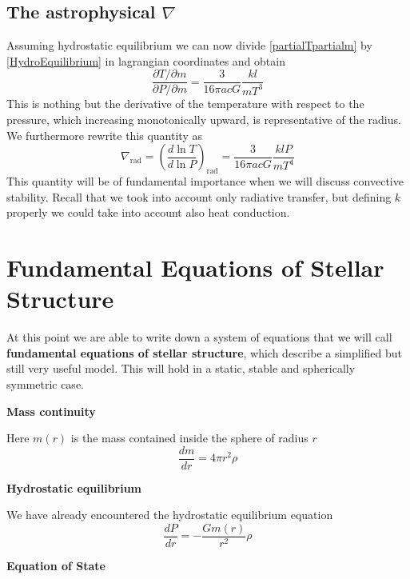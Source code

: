 \subsection{The astrophysical $\nabla$}
Assuming hydrostatic equilibrium we can now divide \ref{partialTpartialm} by \ref{HydroEquilibrium} in lagrangian coordinates and obtain
\begin{equation}
	\frac{\partial T/\partial m}{\partial P / \partial m} = \frac{3}{16 \pi a c G} \frac{k l}{m T^3}
\end{equation}
This is nothing but the derivative of the temperature with respect to the pressure, which increasing monotonically upward, is representative of the radius. We furthermore rewrite this quantity as
\begin{equation}\label{nablarad}
	\nabla_{\mathrm{rad}} = \left( \frac{d \ln T}{d \ln P}  \right)_{\mathrm{rad}}= \frac{3}{16 \pi a c G} \frac{k l P}{m T^4}
\end{equation}
This quantity will be of fundamental importance when we will discuss convective stability. Recall that we took into account only radiative transfer, but defining $k$ properly we could take into account also heat conduction.
\section{Fundamental Equations of Stellar Structure}
At this point we are able to write down a system of equations that we will call \textbf{fundamental equations of stellar structure}, which describe a simplified but still very useful model. This will hold in a static, stable and spherically symmetric case.

\textbf{Mass continuity} 

Here $m(r)$ is the mass contained inside the sphere of radius $r$
\begin{equation}\label{masscons}
	\frac{dm}{dr}=4 \pi r^2 \rho
\end{equation}

\textbf{Hydrostatic equilibrium} 

We have already encountered the hydrostatic equilibrium equation
\begin{equation}\label{hydroeq}
	\frac{dP}{dr}= - \frac{G m(r)}{r^2} \rho
\end{equation}

\textbf{Equation of State} 

